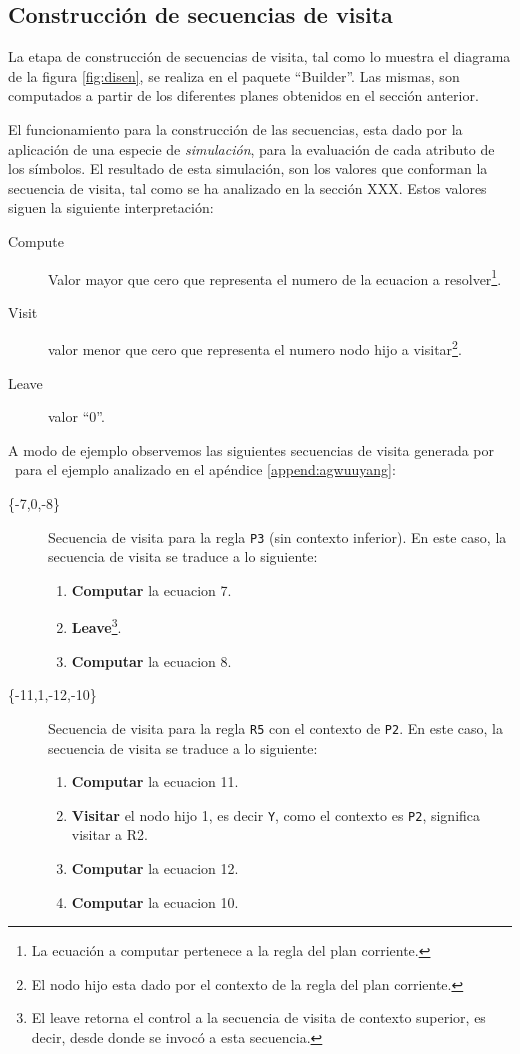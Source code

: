 \subsection*{Construcción de secuencias de visita}
La etapa de construcción de secuencias de visita, tal como lo muestra el diagrama de la figura \ref{fig:disen}, se realiza en el paquete ``Builder''. Las mismas, son computados a partir de los diferentes planes obtenidos en el sección anterior.

El funcionamiento para la construcción de las secuencias, esta dado por la aplicación de una especie de \textit{simulación}, para la evaluación de cada atributo de los símbolos. El resultado de esta simulación, son los valores que conforman la secuencia de visita, tal como se ha analizado en la sección XXX. Estos valores siguen la siguiente interpretación: 
\begin{description}
\item [Compute] Valor mayor que cero que representa el numero de la ecuacion a resolver\footnote{La ecuación a computar pertenece a la regla del plan corriente.}.
\item [Visit] valor menor que cero que representa el numero nodo hijo a visitar\footnote{El nodo hijo esta dado por el contexto de la regla del plan corriente.}.
\item [Leave] valor ``0''.
\end{description}
A modo de ejemplo observemos las siguientes secuencias de visita generada por \maggen\ para el ejemplo analizado en el apéndice \ref{append:agwuuyang}:
\begin{description}
\item [\{-7,0,-8\}] Secuencia de visita para la regla \texttt{P3} (sin contexto inferior). En este caso, la secuencia de visita se traduce a lo siguiente:
\begin{enumerate}
\item \textbf{Computar} la ecuacion 7.
\item \textbf{Leave}\footnote{El leave retorna el control a la secuencia de visita de contexto superior, es decir, desde donde se invocó a esta secuencia.}.
\item \textbf{Computar} la ecuacion 8.
\end{enumerate}

\item [\{-11,1,-12,-10\}] Secuencia de visita para la regla \texttt{R5} con el contexto de \texttt{P2}. En este caso, la secuencia de visita se traduce a lo siguiente:
\begin{enumerate}
\item \textbf{Computar} la ecuacion 11.
\item \textbf{Visitar} el nodo hijo 1, es decir \texttt{Y}, como el contexto es \texttt{P2}, significa visitar a R2.
\item \textbf{Computar} la ecuacion 12.
\item \textbf{Computar} la ecuacion 10.
\end{enumerate}

\end{description}
